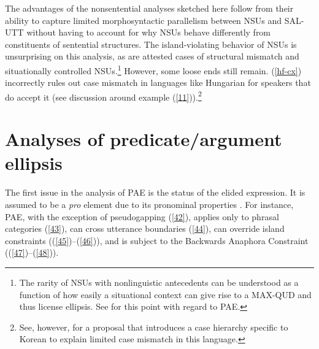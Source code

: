 {The advantages of the nonsentential analyses sketched here follow from their ability to capture limited morphosyntactic parallelism between NSUs and SAL-UTT without having to account for why NSUs behave differently from constituents of sentential structures. The island-violating behavior of NSUs is unsurprising on this analysis, as are attested cases of structural mismatch and situationally controlled NSUs.\footnote{The rarity of NSUs with nonlinguistic antecedents can be understood as a function of how easily a situational context can give rise to a MAX-QUD and thus license ellipsis. See \citet{Miller2014b} for this point with regard to PAE.} 
However, some loose ends still remain. (\ref{hf-cx}) %
incorrectly rules out case mismatch in languages like Hungarian for speakers that do accept it (see discussion around example (\ref{11})).\footnote{See, however, \citet{Kim2015} for a proposal that introduces a case hierarchy specific to Korean to explain limited case mismatch in this language.}


\section{Analyses of predicate/argument ellipsis}
\label{sec-analyses-of-pred-ellipsis}
The first issue in the analysis of PAE is the status of the elided expression. It is assumed to be a \textit{pro} element due to its pronominal properties \citep[see][]{Lobeck1995, Lopez2000, Kim2006, Aelbrecht2015, Ginzburg2018}. For instance, PAE, with the exception of pseudogapping (\ref{42}), applies only to phrasal categories (\ref{43}),
can cross utterance boundaries (\ref{44}), can override island constraints ((\ref{45})--(\ref{46})), and is subject to the Backwards Anaphora Constraint ((\ref{47})--(\ref{48})).

\z
{}
\z
{}
\z
{}
\z
{}
\z
{}
\z
{}
\z

}
